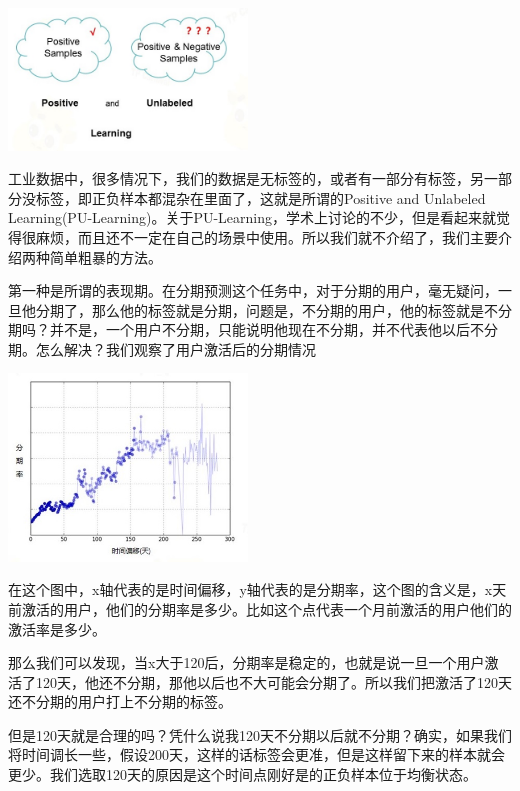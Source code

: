 \documentclass{article}
\begin{document}
\begin{center}
\includegraphics[width=2.5in]{image/image260.jpg}
\end{center}

工业数据中，很多情况下，我们的数据是无标签的，或者有一部分有标签，另一部分没标签，即正负样本都混杂在里面了，这就是所谓的Positive and Unlabeled Learning(PU-Learning)。关于PU-Learning，学术上讨论的不少，但是看起来就觉得很麻烦，而且还不一定在自己的场景中使用。所以我们就不介绍了，我们主要介绍两种简单粗暴的方法。

第一种是所谓的表现期。在分期预测这个任务中，对于分期的用户，毫无疑问，一旦他分期了，那么他的标签就是分期，问题是，不分期的用户，他的标签就是不分期吗？并不是，一个用户不分期，只能说明他现在不分期，并不代表他以后不分期。怎么解决？我们观察了用户激活后的分期情况

\begin{center}
\includegraphics[width=2.5in]{image/image261.jpg}
\end{center}

在这个图中，x轴代表的是时间偏移，y轴代表的是分期率，这个图的含义是，x天前激活的用户，他们的分期率是多少。比如这个点代表一个月前激活的用户他们的激活率是多少。

那么我们可以发现，当x大于120后，分期率是稳定的，也就是说一旦一个用户激活了120天，他还不分期，那他以后也不大可能会分期了。所以我们把激活了120天还不分期的用户打上不分期的标签。

但是120天就是合理的吗？凭什么说我120天不分期以后就不分期？确实，如果我们将时间调长一些，假设200天，这样的话标签会更准，但是这样留下来的样本就会更少。我们选取120天的原因是这个时间点刚好是的正负样本位于均衡状态。
\end{document}
